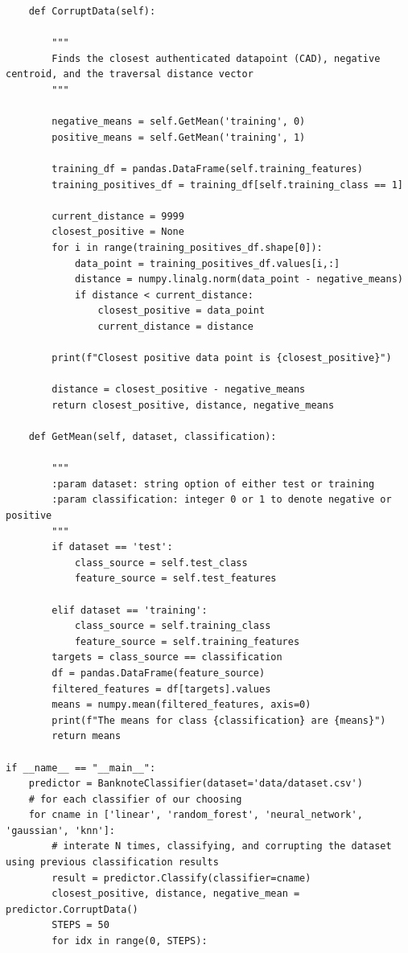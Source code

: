 \documentclass{article}
\begin{document}
\begin{appendices}
\begin{lstlisting}
    def CorruptData(self):
    
        """
        Finds the closest authenticated datapoint (CAD), negative centroid, and the traversal distance vector
        """

        negative_means = self.GetMean('training', 0)
        positive_means = self.GetMean('training', 1)

        training_df = pandas.DataFrame(self.training_features)
        training_positives_df = training_df[self.training_class == 1]

        current_distance = 9999
        closest_positive = None
        for i in range(training_positives_df.shape[0]):
            data_point = training_positives_df.values[i,:]
            distance = numpy.linalg.norm(data_point - negative_means)
            if distance < current_distance:
                closest_positive = data_point
                current_distance = distance

        print(f"Closest positive data point is {closest_positive}")

        distance = closest_positive - negative_means
        return closest_positive, distance, negative_means
        
    def GetMean(self, dataset, classification):

        """
        :param dataset: string option of either test or training
        :param classification: integer 0 or 1 to denote negative or positive
        """
        if dataset == 'test':
            class_source = self.test_class
            feature_source = self.test_features

        elif dataset == 'training':
            class_source = self.training_class
            feature_source = self.training_features
        targets = class_source == classification
        df = pandas.DataFrame(feature_source)
        filtered_features = df[targets].values
        means = numpy.mean(filtered_features, axis=0)
        print(f"The means for class {classification} are {means}")
        return means

if __name__ == "__main__":
    predictor = BanknoteClassifier(dataset='data/dataset.csv')
    # for each classifier of our choosing
    for cname in ['linear', 'random_forest', 'neural_network', 'gaussian', 'knn']:
        # interate N times, classifying, and corrupting the dataset using previous classification results
        result = predictor.Classify(classifier=cname)
        closest_positive, distance, negative_mean = predictor.CorruptData()
        STEPS = 50
        for idx in range(0, STEPS):


\end{lstlisting}
\end{appendices}
\end{document}
